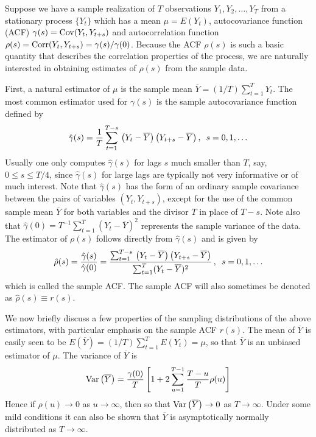 Suppose we have a sample realization of $T$ observations $Y_1, Y_2, \ldots, Y_T$ from a stationary process $\{Y_t\}$ which has a mean $\mu=E(Y_t)$, autocovariance function (ACF) $\gamma(s)=\operatorname{Cov}(Y_t,Y_{t+s})$ and autocorrelation function $\rho(s)=\operatorname{Corr}(Y_t,Y_{t+s}) = \gamma(s)/\gamma(0)$. Because the ACF $\rho(s)$ is such a basic quantity that describes the correlation properties of the process, we are naturally interested in obtaining estimates of $\rho(s)$ from the sample data.


First, a natural estimator of $\mu$ is the sample mean $\overline{Y}=(1/T)\sum_{t=1}^T Y_t$. The most common estimator used for $\gamma(s)$ is the sample autocovariance function defined by
	\[
	\hat{\gamma}(s)= \frac{1}{T} \sum_{t=1}^{T-s} \, \left(Y_{t}-\overline{Y}\right) \left(Y_{t+s}-\overline{Y}\right), \enskip s=0, 1, \ldots
	\]
Usually one only computes $\hat{\gamma}(s)$ for lags $s$ much smaller than $T$, say, $0 \leq s \leq T/4$, since $\hat{\gamma}(s)$ for large lags are typically not very informative or of much interest. Note that $\hat{\gamma}(s)$ has the form of an ordinary sample covariance between the pairs of variables $(Y_t, Y_{t+s})$, except for the use of the common sample mean $\overline{Y}$ for both variables and the divisor $T$ in place of $T-s$.  Note also that $\hat{\gamma}(0) = T^{-1}\sum_{t=1}^T(Y_t-\overline{Y})^2$ represents the sample variance of the data.  The estimator of $\rho(s)$ follows directly from $\hat{\gamma}(s)$ and is given by
	\begin{equation}\label{eqn:hatrho}
         \hat{\rho}(s) = \frac{\hat{\gamma}(s)}{\hat{\gamma}(0)}= \frac{\sum_{t=1}^{T-s} \, \left(Y_{t}-\overline{Y}\right) \left(Y_{t+s}-\overline{Y}\right)}{\sum_{t=1}^T(Y_t-\overline{Y})^2}\, , \enskip s = 0, 1, \ldots 
	\end{equation}
which is called the sample ACF.  The sample ACF will also sometimes be denoted as $\hat{\rho}(s) \equiv r(s)$.


We now briefly discuss a few properties of the sampling distributions of the above estimators, with particular emphasis on the sample ACF $r(s)$.  The mean of $\overline{Y}$ is easily seen to be $E(\overline{Y})=(1/T)\sum_{t=1}^T E(Y_t) = \mu$, so that $\overline{Y}$ is an unbiased estimator of $\mu$.  The variance of $\overline{Y}$ is
	\begin{equation} \label{eqn:var}
        \Var\left(\overline{Y}\right)= \frac{\gamma(0)}{T} \left[1 + 2 \sum_{u=1}^{T-1} \frac{T-u}{T}\rho(u)\right]  
        \end{equation}
Hence if $\rho(u) \rightarrow 0$ as $u \rightarrow \infty$, then so that $\operatorname{Var}\left(\overline{Y}\right) \rightarrow 0$ as $T \rightarrow \infty$. Under some mild conditions it can also be shown that $\overline{Y}$ is asymptotically normally distributed as $T \rightarrow \infty$.


